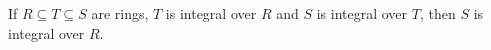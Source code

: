 If $R \subseteq T \subseteq S$ are rings, $T$ is integral over $R$ and $S$ is integral
over $T$, then $S$ is integral over $R$.

